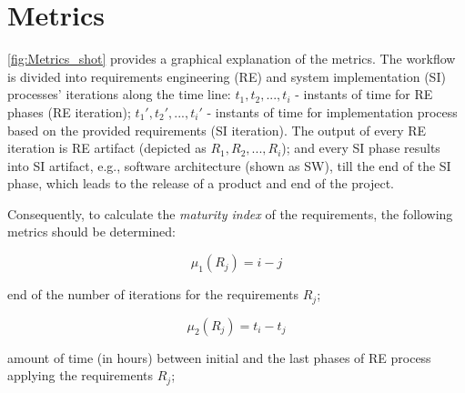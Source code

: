\section{Metrics}
\label{sec:Solution} 
%

%
\autoref{fig:Metrics_shot} provides a graphical explanation of the metrics. The workflow is divided into requirements engineering (RE) 
and system implementation (SI) processes' iterations along the time line: $t_{1},t_{2},...,t_{i}$ - 
instants of time for RE phases (RE iteration); $t_{1}',t_{2}',...,t_{i}'$ - 
instants of time for implementation process based on the provided requirements (SI iteration).
The output of every RE iteration is RE artifact (depicted as $R_{1},R_{2},...,R_{i}$); and every SI phase results into SI artifact, 
e.g., software architecture (shown as SW), till the end of the SI phase, which leads to the release of a product and end of the project.  

Consequently, to calculate the \textit{maturity index} of the requirements, the following metrics should be determined:

 \begin{equation}\label{eqn:mu1}
\mu_{1}(R_{j}) = i-j
	\end{equation}
	
\textrm{end of the number of iterations for the requirements} $R_{j}$;

 \begin{equation}\label{eqn:mu2}
\mu_{2}(R_{j}) = t_{i}-t_{j}    
 \end{equation}

\textrm{amount of time (in hours) between initial and the last phases of RE process applying the requirements} $R_{j}$;

%




